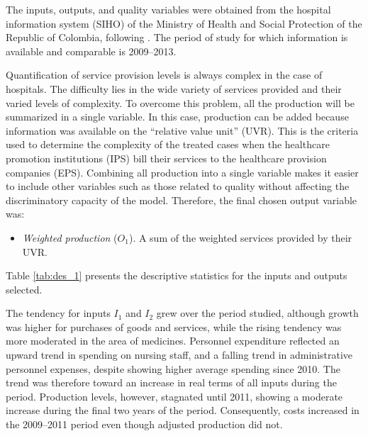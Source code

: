 \documentclass[11pt,a4paper,oneside]{article}
\begin{document}

The inputs, outputs, and quality variables were obtained from the hospital information system (SIHO) of the Ministry of Health and Social Protection of the Republic of Colombia, following \cite{Tamayo:2007bg}. The period of study for which information is available and comparable is 2009--2013.


Quantification of service provision levels is always complex in the case of hospitals. The difficulty lies in the wide variety of services provided and their varied levels of complexity. To overcome this problem, all the production will be summarized in a single variable. In this case, production can be added because information was available on the ``relative value unit'' (UVR). This is the criteria used to determine the complexity of the treated cases when the healthcare promotion institutions (IPS) bill their services to the healthcare provision companies (EPS). Combining all production into a single variable makes it easier to include other variables such as those related to quality without affecting the discriminatory capacity of the model. Therefore, the final chosen output variable was:
%
\begin{itemize} [leftmargin=2cm]
	\item \textit{Weighted production} ($O_1$). A sum of the weighted services provided by their UVR.
\end{itemize}

Table \ref{tab:des_1} presents the descriptive statistics for the inputs and outputs selected.



The tendency for inputs $I_1$ and $I_2$ grew over the period studied, although 
growth was higher for purchases of goods and services, while the rising tendency was more moderated in the area of medicines. Personnel expenditure reflected an upward trend in spending on nursing staff, and a falling trend in administrative personnel expenses, despite showing higher average spending since 2010. The trend was therefore toward an increase in real terms of all inputs during the period. Production levels, however, stagnated until 2011, showing a moderate increase during the final two years of the period. Consequently, costs increased in the 2009--2011 period even though
adjusted production did not.
\end{document}

